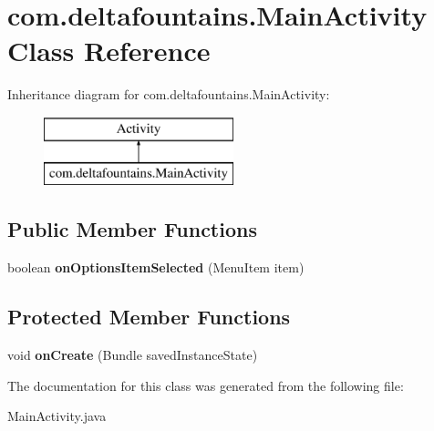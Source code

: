 \hypertarget{classcom_1_1deltafountains_1_1MainActivity}{\section{com.\-deltafountains.\-Main\-Activity Class Reference}
\label{classcom_1_1deltafountains_1_1MainActivity}
}
Inheritance diagram for com.\-deltafountains.\-Main\-Activity\-:\begin{figure}[H]
\begin{center}
\leavevmode
\includegraphics[height=2.000000cm]{classcom_1_1deltafountains_1_1MainActivity}
\end{center}
\end{figure}
\subsection*{Public Member Functions}
\begin{DoxyCompactItemize}
\item 
\hypertarget{classcom_1_1deltafountains_1_1MainActivity_aafda8d017f103f7f31a97a0029a7cacc}{boolean {\bfseries on\-Options\-Item\-Selected} (Menu\-Item item)}\label{classcom_1_1deltafountains_1_1MainActivity_aafda8d017f103f7f31a97a0029a7cacc}

\end{DoxyCompactItemize}
\subsection*{Protected Member Functions}
\begin{DoxyCompactItemize}
\item 
\hypertarget{classcom_1_1deltafountains_1_1MainActivity_aaf458bbf1f883307df234bdda5e368f4}{void {\bfseries on\-Create} (Bundle saved\-Instance\-State)}\label{classcom_1_1deltafountains_1_1MainActivity_aaf458bbf1f883307df234bdda5e368f4}

\end{DoxyCompactItemize}


The documentation for this class was generated from the following file\-:\begin{DoxyCompactItemize}
\item 
Main\-Activity.\-java\end{DoxyCompactItemize}

